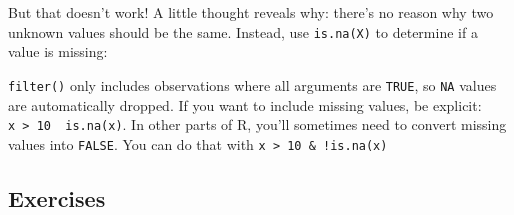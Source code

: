 But that doesn't work! A little thought reveals why: there's no reason
why two unknown values should be the same. Instead, use
\texttt{is.na(X)} to determine if a value is missing: 

\begin{Shaded}
\begin{Highlighting}[]
\end{Highlighting}
\end{Shaded}

\texttt{filter()} only includes observations where all arguments are
\texttt{TRUE}, so \texttt{NA} values are automatically dropped. If you
want to include missing values, be explicit:
\texttt{x\ \textgreater{}\ 10\ \textbar{}\ is.na(x)}. In other parts of
R, you'll sometimes need to convert missing values into \texttt{FALSE}.
You can do that with \texttt{x\ \textgreater{}\ 10\ \&\ !is.na(x)}

\subsection{Exercises}\label{exercises}

